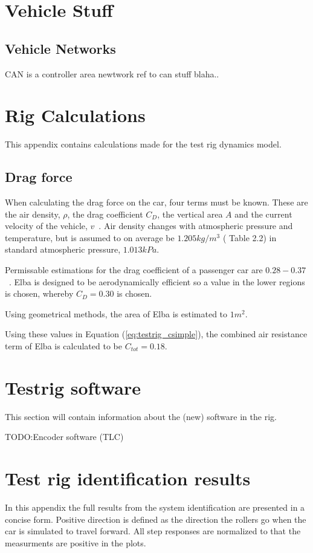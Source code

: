 \chapter{Vehicle Stuff}\label{appA}

\section{Vehicle Networks}
CAN is a controller area newtwork ref to can stuff blaha..

\chapter{Rig Calculations}\label{app:rigdata}
This appendix contains calculations made for the test rig dynamics model. 

\section*{Drag force}
When calculating the drag force on the car, four terms must be known.
These are the air density, $\rho$, the drag coefficient $C_D$, the vertical area
$A$ and the current velocity of the vehicle, $v$~\cite{nakayama2002}. Air
density changes with atmospheric pressure and temperature, but is assumed to on
average be $1.205\si{kg/m^3}$ (\cite{nakayama2002} Table 2.2) in standard
atmospheric pressure, $1.013\si{kPa}$. 

Permissable estimations for the drag coefficient of a passenger car are
$0.28-0.37$~\cite{nakayama2002}. Elba is designed to be aerodynamically
efficient so a value in the lower regions is chosen, whereby $C_D = 0.30$ is
chosen.

Using geometrical methods, the area of Elba is estimated to $1\si{m^2}$.

Using these values in Equation (\ref{eq:testrig_csimple}), the combined air
resistance term of Elba is calculated to be $C_{tot} = 0.18$.

\chapter{Testrig software} 
This section will contain information about the (new) software in the rig.

TODO\@:Encoder software (TLC)

\chapter{Test rig identification results} \label{app:identification}
In this appendix the full results from the system identification are presented
in a concise form. Positive direction is defined as the direction the rollers go
when the car is simulated to travel forward. All step responses are normalized
to that the measurments are positive in the plots.

